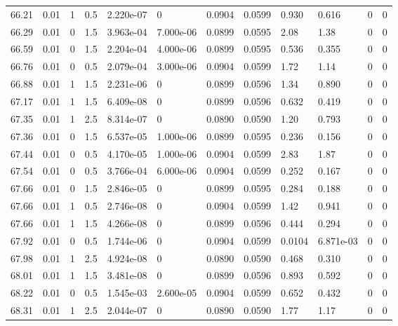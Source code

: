 \documentclass[preview]{standalone}
\begin{document}
{{{{{{{{{{{{{\begin{tabular}{L{1.2cm}C{1.2cm} C{0.3cm}C{0.5cm} C{1.4cm}C{1.4cm} C{1.4cm}C{1.4cm} C{1.6cm}C{1.6cm} C{1.6cm}C{1.6cm}}
  66.21  &  0.01  & 1     & 0.5 &  2.220e-07  & 0  &  0.0904&   0.0599& 0.930 & 0.616   &  0 & 0  \\ 
  66.29  &  0.01  & 0     & 1.5 &  3.963e-04  & 7.000e-06  &  0.0899&   0.0595& 2.08 & 1.38   &  0 & 0  \\ 
  66.59  &  0.01  & 0     & 1.5 &  2.204e-04  & 4.000e-06  &  0.0899&   0.0595& 0.536 & 0.355   &  0 & 0  \\ 
  66.76  &  0.01  & 0     & 0.5 &  2.079e-04  & 3.000e-06  &  0.0904&   0.0599& 1.72 & 1.14   &  0 & 0  \\ 
  66.88  &  0.01  & 1     & 1.5 &  2.231e-06  & 0  &  0.0899&   0.0596& 1.34 & 0.890   &  0 & 0  \\ 
  67.17  &  0.01  & 1     & 1.5 &  6.409e-08  & 0  &  0.0899&   0.0596& 0.632 & 0.419   &  0 & 0  \\ 
  67.35  &  0.01  & 1     & 2.5 &  8.314e-07  & 0  &  0.0890&   0.0590& 1.20 & 0.793   &  0 & 0  \\ 
  67.36  &  0.01  & 0     & 1.5 &  6.537e-05  & 1.000e-06  &  0.0899&   0.0595& 0.236 & 0.156   &  0 & 0  \\ 
  67.44  &  0.01  & 0     & 0.5 &  4.170e-05  & 1.000e-06  &  0.0904&   0.0599& 2.83 & 1.87   &  0 & 0  \\ 
  67.54  &  0.01  & 0     & 0.5 &  3.766e-04  & 6.000e-06  &  0.0904&   0.0599& 0.252 & 0.167   &  0 & 0  \\ 
  67.66  &  0.01  & 0     & 1.5 &  2.846e-05  & 0  &  0.0899&   0.0595& 0.284 & 0.188   &  0 & 0  \\ 
  67.66  &  0.01  & 1     & 0.5 &  2.746e-08  & 0  &  0.0904&   0.0599& 1.42 & 0.941   &  0 & 0  \\ 
  67.66  &  0.01  & 1     & 1.5 &  4.266e-08  & 0  &  0.0899&   0.0596& 0.444 & 0.294   &  0 & 0  \\ 
  67.92  &  0.01  & 0     & 0.5 &  1.744e-06  & 0  &  0.0904&   0.0599& 0.0104 & 6.871e-03   &  0 & 0  \\ 
  67.98  &  0.01  & 1     & 2.5 &  4.924e-08  & 0  &  0.0890&   0.0590& 0.468 & 0.310   &  0 & 0  \\ 
  68.01  &  0.01  & 1     & 1.5 &  3.481e-08  & 0  &  0.0899&   0.0596& 0.893 & 0.592   &  0 & 0  \\ 
  68.22  &  0.01  & 0     & 0.5 &  1.545e-03  & 2.600e-05  &  0.0904&   0.0599& 0.652 & 0.432   &  0 & 0  \\ 
  68.31  &  0.01  & 1     & 2.5 &  2.044e-07  & 0  &  0.0890&   0.0590& 1.77 & 1.17   &  0 & 0  \\ 

\end{tabular}}}}}}}}}}}}}}
\end{document}
